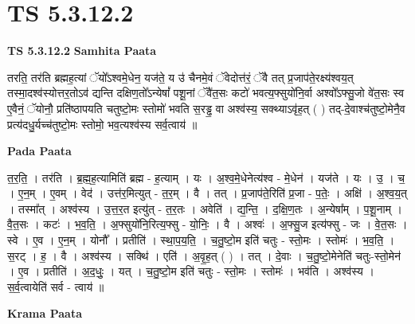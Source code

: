 \documentclass[17pt]{extarticle}
\begin{document}
\section{ TS 5.3.12.2 }

\textbf{TS 5.3.12.2 } \newline
\textbf{Samhita Paata} \newline

तरति॒ तर॑ति ब्रह्मह॒त्यां ॅयो᳚ऽश्वमे॒धेन॒ यज॑ते॒ य उ॑ चैनमे॒वं ॅवेदोत्त॑रं॒ ॅवै तत् प्र॒जाप॑ते॒रक्ष्य॑श्वय॒त् तस्मा॒दश्व॑स्योत्तर॒तोऽव॑ द्यन्ति दक्षिण॒तो᳚ऽन्येषां᳚ पशू॒नां ॅवै॑त॒सः कटो॑ भवत्य॒फ्सुयो॑नि॒र्वा अश्वो᳚ऽफ्सु॒जो वे॑त॒सः स्व ए॒वैनं॒ ॅयोनौ॒ प्रति॑ष्ठापयति चतुष्टो॒मः स्तोमो॑ भवति स॒रड्ढ॒ वा अश्व॑स्य॒ सक्थ्याऽवृ॑ह॒त् ( ) तद्-दे॒वाश्च॑तुष्टो॒मेनै॒व प्रत्य॑दधु॒र्यच्च॑तुष्टो॒मः स्तोमो॒ भव॒त्यश्व॑स्य सर्व॒त्वाय॑ ॥ \newline

\textbf{Pada Paata} \newline

त॒र॒ति॒ । तर॑ति । ब्र॒ह्म॒ह॒त्यामिति॑ ब्रह्म - ह॒त्याम् । यः । अ॒श्व॒मे॒धेनेत्य॑श्व - मे॒धेन॑ । यज॑ते । यः । उ॒ । च॒ । ए॒न॒म् । ए॒वम् । वेद॑ । उत्त॑र॒मित्युत् - त॒र॒म् । वै । तत् । प्र॒जाप॑ते॒रिति॑ प्र॒जा - प॒तेः॒ । अक्षि॑ । अ॒श्व॒य॒त् । तस्मा᳚त् । अश्व॑स्य । उ॒त्त॒र॒त इत्यु॑त् - त॒र॒तः । अवेति॑ । द्य॒न्ति॒ । द॒क्षि॒ण॒तः । अ॒न्येषा᳚म् । प॒शू॒नाम् । वै॒त॒सः । कटः॑ । भ॒व॒ति॒ । अ॒फ्सुयो॑नि॒रित्य॒फ्सु - यो॒निः॒ । वै । अश्वः॑ । अ॒फ्सु॒ज इत्य॑फ्सु - जः । वे॒त॒सः । स्वे । ए॒व । ए॒न॒म् । योनौ᳚ । प्रतीति॑ । स्था॒प॒य॒ति॒ । च॒तु॒ष्टो॒म इति॑ चतुः - स्तो॒मः । स्तोमः॑ । भ॒व॒ति॒ । स॒रट् । ह॒ । वै । अश्व॑स्य । सक्थि॑ । एति॑ । अ॒वृ॒ह॒त् ( ) । तत् । दे॒वाः । च॒तु॒ष्टो॒मेनेति॑ चतुः-स्तो॒मेन॑ । ए॒व । प्रतीति॑ । अ॒द॒धुः॒ । यत् । च॒तु॒ष्टो॒म इति॑ चतुः - स्तो॒मः । स्तोमः॑ । भव॑ति । अश्व॑स्य । स॒र्व॒त्वायेति॑ सर्व - त्वाय॑ ॥  \newline


\textbf{Krama Paata} \newline
\end{document}
